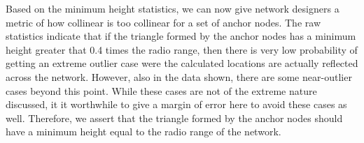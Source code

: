 Based on the minimum height statistics, we can now give network designers a metric of how collinear is too collinear for a set of anchor nodes.  The raw statistics indicate that if the triangle formed by the anchor nodes has a minimum height greater that 0.4 times the radio range, then there is very low probability of getting an extreme outlier case were the calculated locations are actually reflected across the network.  However, also in the data shown, there are some near-outlier cases beyond this point.  While these cases are not of the extreme nature discussed, it it worthwhile to give a margin of error here to avoid these cases as well.  Therefore, we assert that the triangle formed by the anchor nodes should have a minimum height equal to the radio range of the network.
